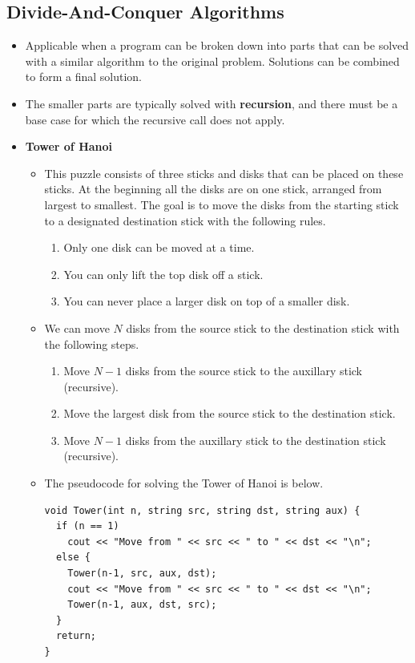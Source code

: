 \documentclass{article}
\begin{document}
\subsection*{Divide-And-Conquer Algorithms}
\begin{itemize}
    \item Applicable when a program can be broken down into parts that can be solved with a similar algorithm to the original problem. Solutions can be combined to form a final solution.
    \item The smaller parts are typically solved with \textbf{recursion}, and there must be a base case for which the recursive call does not apply.
    \item \textbf{Tower of Hanoi}
    \begin{itemize}
        \item This puzzle consists of three sticks and disks that can be placed on these sticks. At the beginning all the disks are on one stick, arranged from largest to smallest. The goal is to move the disks from the starting stick to a designated destination stick with the following rules.
        \begin{enumerate}
            \item Only one disk can be moved at a time.
            \item You can only lift the top disk off a stick.
            \item You can never place a larger disk on top of a smaller disk.
        \end{enumerate}
        \item We can move \(N\) disks from the source stick to the destination stick with the following steps.
        \begin{enumerate}
            \item Move \(N-1\) disks from the source stick to the auxillary stick (recursive).
            \item Move the largest disk from the source stick to the destination stick.
            \item Move \(N-1\) disks from the auxillary stick to the destination stick (recursive).
        \end{enumerate}
        \item The pseudocode for solving the Tower of Hanoi is below.
\begin{verbatim}
void Tower(int n, string src, string dst, string aux) {
  if (n == 1)
    cout << "Move from " << src << " to " << dst << "\n";
  else {
    Tower(n-1, src, aux, dst);
    cout << "Move from " << src << " to " << dst << "\n";
    Tower(n-1, aux, dst, src);
  }
  return;
}
\end{verbatim}
    \end{itemize}
\end{itemize}
\end{document}
